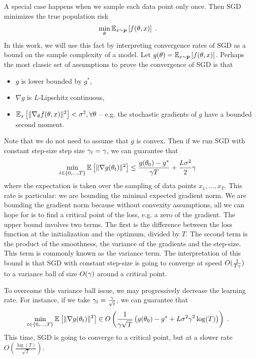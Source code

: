 A special case happens when we sample each data point only once.
Then  SGD minimizes the true population risk 
\begin{align}
    \min_\theta \expect[x\sim \ptrue]{f(\theta, x)} \; .
\end{align}
In this work, we will use this fact by interpreting convergence rates  of SGD as a bound on the sample complexity of a model. 
Let $g(\theta) = \expect[x\sim \ptrue]{f(\theta, x)}$. Perhaps the most classic set of assumptions to prove the convergence of SGD is that 
\begin{itemize}
    \item $g$ is lower bounded by $g^*$,
    \item $\nabla g$ is $L$-Lipschitz continuous,
    \item $\expect[x]{\|\nabla_\theta f(\theta, x)\|^2} < \sigma^2, \forall \theta$ -- e.g. the stochastic gradients of $g$ have a bounded second moment.
\end{itemize}
Note that we do not need to assume that $g$ is convex.
Then if we run SGD with constant step-size step size $\lr_t = \lr$, we can guarantee that
\begin{align}
    \min_{t\in \{0, \dots, T\} } \expect{\|\nabla g(\theta_t)\|^2} 
    \leq \frac{g(\theta_0) - g^*}{\lr T} + \frac{L \sigma^2}{2} \lr 
\end{align}
where the expectation is taken over the sampling of data points $x_1, \dots, x_T$. 
This rate is particular: we are bounding the minimal expected gradient norm. We are bounding the gradient norm because without convexity assumptions, all we can hope for is to find a critical point of the loss, e.g. a zero of the gradient. 
The upper bound involves two terms. The first is the difference between the loss function at the initialization and the optimum, divided by $T$. The second term 
is  the product of the smoothness, the variance of the gradients and the step-size. This term is commonly known as the variance term. The interpretation of this bound is that SGD with constant step-size is going to converge at speed $O(\inv{T \lr})$ to a variance ball of size $O(\lr)$ around a critical point.

To overcome this variance ball issue, we may progressively decrease the learning rate. For instance, if we take  $\lr_t = \frac{\lr}{\sqrt{t}}$, we can guarantee that
\begin{align}
    \min_{t\in \{0, \dots, T\} } \expect{\|\nabla g(\theta_t)\|^2} 
    \in O \left( \frac{1}{\lr \sqrt{T}} \left ( g(\theta_0) - g^* + L \sigma^2 \lr^2 \log(T) \right ) \right )  \; .
\end{align}
This time, SGD is going to converge to a critical point, but at a slower rate $O \left( \frac{\log(T)}{\sqrt{T}} \right )$.


